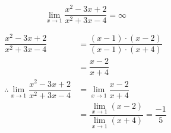 \documentclass[14pt,fleqn]{extarticle}
\begin{document}
 

\[ \lim_{x\to 1} \dfrac{x^2-3x+2}{x^2+3x-4} = \infty\]

\newcard 

\begin{align}
\dfrac{x^2-3x+2}{x^2 + 3x- 4} &= \dfrac{(x-1)\cdot (x-2)}{(x-1)\cdot (x+4)} \\ 
&= \dfrac{x-2}{x+4} \\ 
\therefore \lim_{x\to 1} \dfrac{x^2-3x+2}{x^2+3x-4} &= \lim_{x\to 1}\dfrac{x-2}{x+4} \\ 
&= \dfrac{\lim_{x\to 1} (x-2)}{\lim_{x\to 1}(x+4)} = \dfrac{-1}{5}
\end{align}
\end{document}
